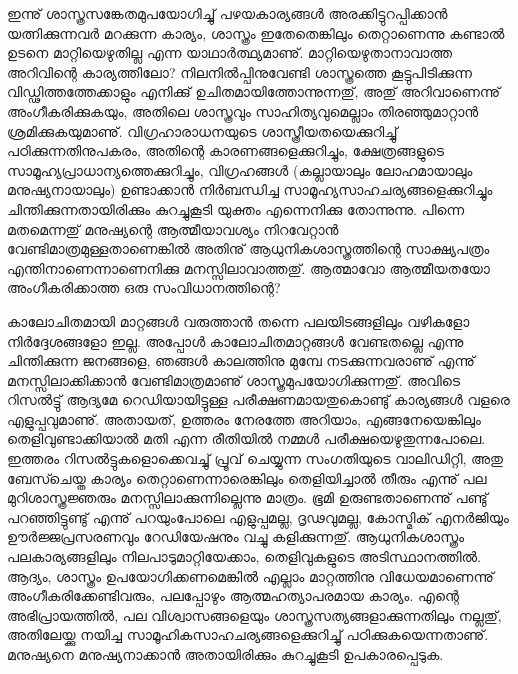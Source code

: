 ഇന്നു് ശാസ്ത്രസങ്കേതമുപയോഗിച്ചു് പഴയകാര്യങ്ങള്‍ അരക്കിട്ടുറപ്പിക്കാന്‍ യത്നിക്കുന്നവര്‍ മറക്കുന്ന കാര്യം, ശാസ്ത്രം ഇതേതെങ്കിലും 
തെറ്റാണെന്നു കണ്ടാല്‍ ഉടനെ മാറ്റിയെഴുതില്ല എന്ന യാഥാര്‍ത്ഥ്യമാണു്. മാറ്റിയെഴുതാനാവാത്ത അറിവിന്റെ കാര്യത്തിലോ? നിലനില്‍പ്പിനുവേണ്ടി 
ശാസ്ത്രത്തെ കൂട്ടുപിടിക്കുന്ന വിഡ്ഢിത്തത്തേക്കാളും എനിക്കു് ഉചിതമായിത്തോന്നുന്നതു്, അതു് അറിവാണെന്നു് അംഗീകരിക്കുകയും, 
അതിലെ ശാസ്ത്രവും സാഹിത്യവുമെല്ലാം തിരഞ്ഞുമാറ്റാന്‍ ശ്രമിക്കുകയുമാണു്. വിഗ്രഹാരാധനയുടെ ശാസ്ത്രീയതയെക്കുറിച്ചു് 
പഠിക്കുന്നതിനുപകരം, അതിന്റെ കാരണങ്ങളെക്കുറിച്ചും, ക്ഷേത്രങ്ങളുടെ സാമൂഹ്യപ്രാധാന്യത്തെക്കുറിച്ചും, വിഗ്രഹങ്ങള്‍ 
(കല്ലായാലും ലോഹമായാലും മനുഷ്യനായാലും) ഉണ്ടാക്കാന്‍ നിര്‍ബന്ധിച്ച സാമൂഹ്യസാഹചര്യങ്ങളെക്കുറിച്ചും 
ചിന്തിക്കുന്നതായിരിക്കും കുറച്ചുകൂടി യുക്തം എന്നെനിക്കു തോന്നുന്നു. പിന്നെ മതമെന്നതു് മനുഷ്യന്റെ ആത്മീയാവശ്യം 
നിറവേറ്റാന്‍ വേണ്ടിമാത്രമുള്ളതാണെങ്കില്‍ അതിനു് ആധുനികശാസ്ത്രത്തിന്റെ സാക്ഷ്യപത്രം എന്തിനാണെന്നാണെനിക്കു 
മനസ്സിലാവാത്തതു്. ആത്മാവോ ആത്മീയതയോ അംഗീകരിക്കാത്ത ഒരു സംവിധാനത്തിന്റെ?

കാലോചിതമായി മാറ്റങ്ങള്‍ വരുത്താന്‍ തന്നെ പലയിടങ്ങളിലും വഴികളോ നിര്‍ദ്ദേശങ്ങളോ ഇല്ല. അപ്പോള്‍ 
കാലോചിതമാറ്റങ്ങള്‍ വേണ്ടതല്ലെ എന്നു ചിന്തിക്കുന്ന ജനങ്ങളെ, ഞങ്ങള്‍ കാലത്തിനു മുമ്പേ നടക്കുന്നവരാണു് 
എന്നു് മനസ്സിലാക്കിക്കാന്‍ വേണ്ടിമാത്രമാണു് ശാസ്ത്രമുപയോഗിക്കുന്നതു്. അവിടെ റിസല്‍ട്ടു് ആദ്യമേ റെഡിയായിട്ടുള്ള 
പരീക്ഷണമായതുകൊണ്ടു് കാര്യങ്ങള്‍ വളരെ എളുപ്പവുമാണു്. അതായത്, ഉത്തരം നേരത്തേ അറിയാം, എങ്ങനേയെങ്കിലും 
തെളിവുണ്ടാക്കിയാല്‍ മതി എന്ന രീതിയില്‍ നമ്മള്‍ പരീക്ഷയെഴുതുന്നപോലെ. ഇത്തരം റിസല്‍ട്ടുകളൊക്കെവച്ചു് പ്രൂവ്
ചെയ്യുന്ന സംഗതിയുടെ വാലിഡിറ്റി, അതു ബേസ്ചെയ്ത കാര്യം തെറ്റാണെന്നാരെങ്കിലും തെളിയിച്ചാല്‍ തീരും എന്നു് പല 
മുറിശാസ്ത്രജ്ഞരും മനസ്സിലാക്കുന്നില്ലെന്നു മാത്രം. ഭൂമി ഉരുണ്ടതാണെന്നു് പണ്ടു് പറഞ്ഞിട്ടുണ്ടു് എന്നു് പറയുംപോലെ 
എളുപ്പമല്ല, ദൃഢവുമല്ല, കോസ്മിക് എനര്‍ജിയും ഊര്‍ജ്ജപ്രസരണവും റേഡിയേഷനും വച്ചു കളിക്കുന്നതു്. ആധുനികശാസ്ത്രം 
പലകാര്യങ്ങളിലും നിലപാടുമാറ്റിയേക്കാം, തെളിവുകളുടെ അടിസ്ഥാനത്തില്‍. ആദ്യം, ശാസ്ത്രം ഉപയോഗിക്കണമെങ്കില്‍ 
എല്ലാം മാറ്റത്തിനു വിധേയമാണെന്നു് അംഗീകരിക്കേണ്ടിവരും, പലപ്പോഴും ആത്മഹത്യാപരമായ കാര്യം. എന്റെ 
അഭിപ്രായത്തില്‍, പല വിശ്വാസങ്ങളെയും ശാസ്ത്രസത്യങ്ങളാക്കുന്നതിലും നല്ലതു്, അതിലേയ്ക്കു നയിച്ച സാമൂഹികസാഹചര്യങ്ങളെക്കുറിച്ചു് പഠിക്കുകയെന്നതാണു്. മനുഷ്യനെ മനുഷ്യനാക്കാന്‍ അതായിരിക്കും കുറച്ചുകൂടി ഉപകാരപ്പെടുക.

